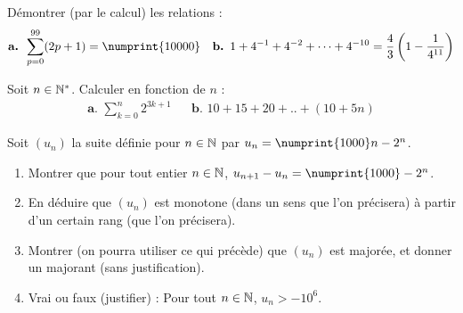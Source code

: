 \documentclass[a4paper,11pt,DIV14,BCOR0mm]{scrartcl}
\begin{document}
\begin{exercice}
 Démontrer (par le calcul) les relations :
\begin{align*}
 \textbf{a. }\sum_{p=0}^{99}(2p+1)=\numprint{10000}	&&
 \textbf{b. }1+4^{-1}+	4^{-2}+\dots+4^{-10}=\frac43\left(1-\frac{1}{4^{11}} \right)
\end{align*}
\end{exercice}

\begin{exercice}
Soit $n\in\mathbb{N}^*$. Calculer en fonction de $n$ :
\begin{align*}
 \textbf{a. }\sum_{k=0}^{n}2^{3k+1}  &&
 \textbf{b. }10 + 15 + 20 + .. + (10+5n)
\end{align*}
\end{exercice}


\begin{exercice}
 Soit $(u_n)$ la suite définie pour $n\in\mathbb{N}$ par $u_n=\numprint{1000}n-2^n$.
\begin{enumerate}
 \item Montrer que pour tout entier $n\in\mathbb{N}$, $u_{n+1}-u_n=\numprint{1000}-2^n$.
 \item En déduire que $(u_n)$ est monotone (dans un sens que l'on précisera) à partir d'un certain rang (que l'on précisera).
 \item Montrer (on pourra utiliser ce qui précède) que $(u_n)$ est majorée, et donner un majorant (sans justification).
 \item Vrai ou faux (justifier) : \og Pour tout $n\in\mathbb{N}$, $u_n>-10^6$\fg. 
\end{enumerate}
\end{exercice}
\end{document}
